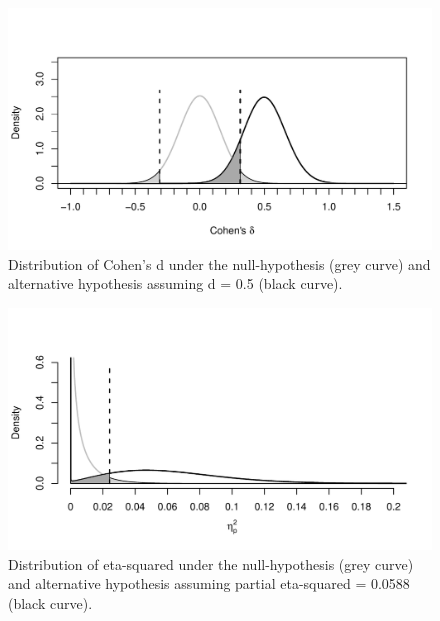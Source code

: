 \documentclass[,jou,floatsintext]{apa6}
\begin{document}
\begin{figure}
\centering
\includegraphics{0.1_Simulation_Based_Power_Analysis_For_Factorial_ANOVA_Designs_files/figure-latex/d-plot-1.pdf}
\caption{\label{fig:d-plot}Distribution of Cohen's d under the null-hypothesis (grey curve) and alternative hypothesis assuming d = 0.5 (black curve).}
\end{figure}

\begin{figure}
\centering
\includegraphics{0.1_Simulation_Based_Power_Analysis_For_Factorial_ANOVA_Designs_files/figure-latex/eta-plot-1.pdf}
\caption{\label{fig:eta-plot}Distribution of eta-squared under the null-hypothesis (grey curve) and alternative hypothesis assuming partial eta-squared = 0.0588 (black curve).}
\end{figure}
\end{document}
